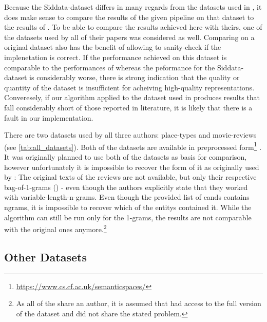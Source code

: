 Because the Siddata-dataset differs in many regards from the datasets used in \mainalgos, %
it does make sense to compare the results of the given pipeline on that dataset to the results of \mainalgos. To be able to compare the results achieved here with theirs, one of the datasets used by all of their papers was considered as well. Comparing on a original dataset also has the benefit of allowing to sanity-check if the implenetation is correct. If the performance achieved on this dataset is comparable to the performances of \mainalgos whereas the peformance for the Siddata-dataset is considerably worse, there is strong indication that the quality or quantity of the dataset is insufficient for acheiving high-quality representations. Converesely, if our algorithm applied to the dataset used in \mainalgos produces results that fall considerably short of those reported in literature, it is likely that there is a fault in our implementation.

There are two datasets used by all three authors: place-types and movie-reviews (see \autoref{tab:all_datasets}). Both of the datasets are available in preprocessed form\footnote{\url{https://www.cs.cf.ac.uk/semanticspaces/}} \cite{Derrac2015}. It was originally planned to use both of the datasets as basis for comparison, however unfortunately it is impossible to recover the form of it as originally used by \textcite{Derrac2015}: The original texts of the reviews are not available, but only their respective bag-of-1-grams () - even though the authors explicitly state that they worked with variable-length-n-grams. Even though the provided list of \glspl{cand} contains \glspl{ngram}, it is impossible to recover which of the \glspl{entity} contained it. While the algorithm can still be run only for the 1-grams, the results are not comparable with the original ones anymore.\footnote{As all of the \mainalgos share an author, it is assumed that \cite{Alshaikh2020,Ager2018} had access to the full version of the dataset and did not share the stated problem.}


\subsection{Other Datasets}



